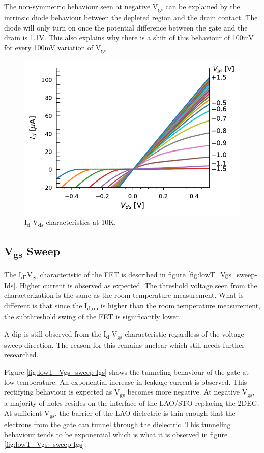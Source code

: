 \documentclass[11pt,a4paper]{report}
\begin{document}
The non-symmetric behaviour seen at negative V\textsubscript{gs} can be explained by the intrinsic diode behaviour between the depleted region and the drain contact. The diode will only turn on once the potential difference between the gate and the drain is 1.1V. This also explains why there is a shift of this behaviour of 100mV for every 100mV variation of V\textsubscript{gs}.


\begin{figure}[!h]
    \centering
    \includegraphics{Figures/LowT/Dev16_LowT_Vds_sweep-Ids}
    \caption{I\textsubscript{d}-V\textsubscript{ds} characteristics at 10K.}
    \label{fig:lowT_Vds_sweep-Ids}
\end{figure}

\subsection{V\textsubscript{gs} Sweep}
The I\textsubscript{d}-V\textsubscript{gs} characteristic of the FET is described in figure \ref{fig:lowT_Vgs_sweep-Ids}. Higher current is observed as expected. The threshold voltage seen from the characterization is the same as the room temperature measurement. What is different is that since the I\textsubscript{d,on} is higher than the room temperature measurement, the subthreshold swing of the FET is significantly lower. 

A dip is still observed from the I\textsubscript{d}-V\textsubscript{gs} characteristic regardless of the voltage sweep direction. The reason for this remains unclear which still needs further researched.

Figure \ref{fig:lowT_Vgs_sweep-Igs} shows the tunneling behaviour of the gate at low temperature. An exponential increase in leakage current is observed. This rectifying behaviour is expected as V\textsubscript{gs} becomes more negative. At negative V\textsubscript{gs}, a majority of holes resides on the interface of the LAO/STO replacing the 2DEG. At sufficient V\textsubscript{gs}, the barrier of the LAO dielectric is thin enough that the electrons from the gate can tunnel through the dielectric. This tunneling behaviour tends to be exponential which is what it is observed in figure \ref{fig:lowT_Vgs_sweep-Igs}.
\end{document}
